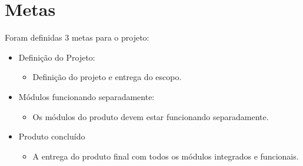 \chapter[Metas]{Metas}

Foram definidas 3 metas para o projeto:

\begin{itemize}
\item Definição do Projeto:
\begin{itemize}
	\item Definição do projeto e entrega do escopo.
\end{itemize}
\item Módulos funcionando separadamente:
\begin{itemize}
	\item  Os módulos do produto devem estar funcionando separadamente.
\end{itemize}
\item Produto concluído
\begin{itemize}
	\item A entrega do produto final com todos os módulos integrados e funcionais.
\end{itemize}
\end{itemize}
